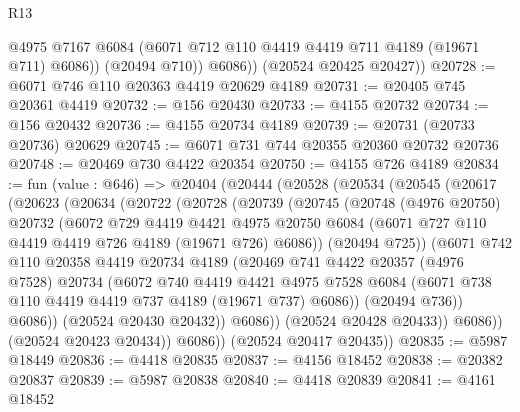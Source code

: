 \begin{lexlean}{R13}
\begin{coremodule}
              @4975
              @7167
              @6084
              (@6071 @712 @110 @4419 @4419 @711 @4189 (@19671 @711) @6086))
            (@20494 @710))
          @6086))
      (@20524 @20425 @20427))
@20728 := @6071 @746 @110 @20363 @4419 @20629 @4189
@20731 := @20405 @745 @20361 @4419
@20732 := @156 @20430
@20733 := @4155 @20732
@20734 := @156 @20432
@20736 := @4155 @20734 @4189
@20739 := @20731 (@20733 @20736) @20629
@20745 := @6071 @731 @744 @20355 @20360 @20732 @20736
@20748 := @20469 @730 @4422 @20354
@20750 := @4155 @726 @4189
@20834 := fun (value : @646) =>
  @20404
    (@20444
      (@20528
        (@20534
          (@20545
            (@20617
              (@20623
                (@20634
                  (@20722
                    (@20728
                      (@20739
                        (@20745
                          (@20748
                            (@4976 @20750)
                            @20732
                            (@6072
                              @729
                              @4419
                              @4421
                              @4975
                              @20750
                              @6084
                              (@6071 @727 @110 @4419 @4419 @726 @4189 (@19671 @726) @6086))
                            (@20494 @725))
                          (@6071
                            @742
                            @110
                            @20358
                            @4419
                            @20734
                            @4189
                            (@20469
                              @741
                              @4422
                              @20357
                              (@4976 @7528)
                              @20734
                              (@6072
                                @740
                                @4419
                                @4421
                                @4975
                                @7528
                                @6084
                                (@6071 @738 @110 @4419 @4419 @737 @4189 (@19671 @737) @6086))
                              (@20494 @736))
                            @6086))
                        (@20524 @20430 @20432))
                      @6086))
                  (@20524 @20428 @20433))
                @6086))
            (@20524 @20423 @20434))
          @6086))
      (@20524 @20417 @20435))
@20835 := @5987 @18449
@20836 := @4418 @20835
@20837 := @4156 @18452
@20838 := @20382 @20837
@20839 := @5987 @20838
@20840 := @4418 @20839
@20841 := @4161 @18452

\end{coremodule}
\end{lexlean}
